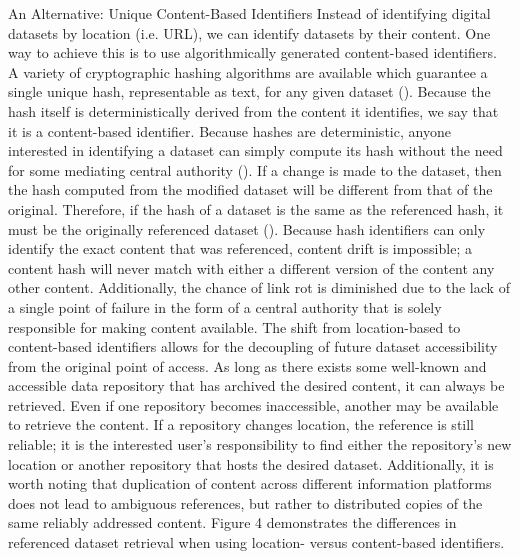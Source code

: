 \documentclass[10pt,letterpaper]{article}
\begin{document}
An Alternative: Unique Content-Based Identifiers
Instead of identifying digital datasets by location (i.e. URL), we can identify datasets by their content. One way to achieve this is to use algorithmically generated content-based identifiers. A variety of cryptographic hashing algorithms are available which guarantee a single unique hash, representable as text, for any given dataset (\cite{SHA2_2001}). Because the hash itself is deterministically derived from the content it identifies, we say that it is a content-based identifier. Because hashes are deterministic, anyone interested in identifying a dataset can simply compute its hash without the need for some mediating central authority (\cite{Paskin_1999}). If a change is made to the dataset, then the hash computed from the modified dataset will be different from that of the original. Therefore, if the hash of a dataset is the same as the referenced hash, it must be the originally referenced dataset (\cite{SHA2_2001}).
Because hash identifiers can only identify the exact content that was referenced, content drift is impossible; a content hash will never match with either a different version of the content any other content. Additionally, the chance of link rot is diminished due to the lack of a single point of failure in the form of a central authority that is solely responsible for making content available. The shift from location-based to content-based identifiers allows for the decoupling of future dataset accessibility from the original point of access. As long as there exists some well-known and accessible data repository that has archived the desired content, it can always be retrieved. Even if one repository becomes inaccessible, another may be available to retrieve the content. If a repository changes location, the reference is still reliable; it is the interested user’s responsibility to find either the repository’s new location or another repository that hosts the desired dataset. Additionally, it is worth noting that duplication of content across different information platforms does not lead to ambiguous references, but rather to distributed copies of the same reliably addressed content. Figure 4 demonstrates the differences in referenced dataset retrieval when using location- versus content-based identifiers.
\end{document}
